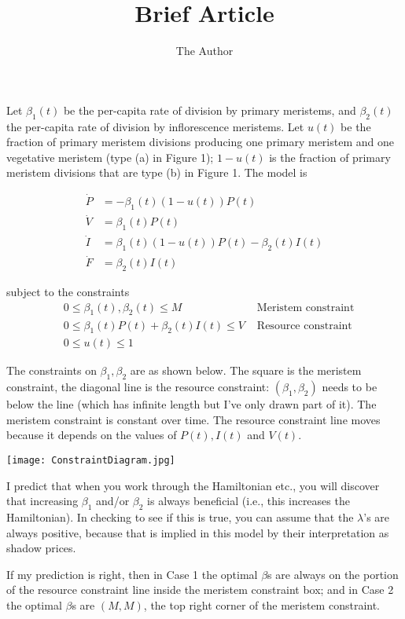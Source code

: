 \documentclass[12pt]{article} %
\title{Brief Article}
\author{The Author}
\begin{document}
Let $\beta_1(t)$ be the per-capita rate of division by primary meristems, and $\beta_2(t)$ the per-capita
rate of division by inflorescence meristems. Let $u(t)$ be the fraction of primary meristem divisions 
producing one primary meristem and one vegetative meristem (type (a) in Figure 1); $1-u(t)$ is the fraction
of primary meristem divisions that are type (b) in Figure 1. The model is 

\begin{equation}
\begin{aligned}
\dot{P} & = -\beta_1(t)(1-u(t))P(t) \\
\dot{V} & = \beta_1(t)P(t) \\
\dot{I} & = \beta_1(t)(1-u(t))P(t) - \beta_2(t)I(t)\\
\dot{F} & = \beta_2(t)I(t) 
\end{aligned}
\end{equation}

subject to the constraints 
\begin{equation}
\begin{aligned}
& 0 \le \beta_1(t), \beta_2(t) \le M & \mbox{ Meristem constraint} \\
& 0 \le \beta_1(t)P(t) + \beta_2(t)I(t) \le V & \mbox{ Resource constraint}\\
& 0 \le u(t) \le 1
\end{aligned}
\end{equation}

The constraints on $\beta_1, \beta_2$ are as shown below. The square is the meristem constraint, the diagonal line is the 
resource constraint: $(\beta_1, \beta_2)$ needs to be below the line (which has infinite length but I've only drawn 
part of it). The meristem constraint is constant over time. The resource constraint line moves because it depends on the
values of $P(t),I(t)$ and $V(t)$. 

\smallskip 

\centerline{\texttt{[image: ConstraintDiagram.jpg]}}

I predict that when you work through the Hamiltonian etc., you will discover that increasing $\beta_1$ and/or $\beta_2$ is
always beneficial (i.e., this increases the Hamiltonian). In checking to see if this is true, you can assume that the 
$\lambda$'s are always positive, because that is implied in this model by their interpretation as shadow prices. 

If my prediction is right, then in Case 1 the optimal $\beta$s are always
on the portion of the resource constraint line inside the meristem constraint box; and 
in Case 2 the optimal $\beta$s are $(M,M)$, the top right corner of the meristem constraint. 
\end{document}
